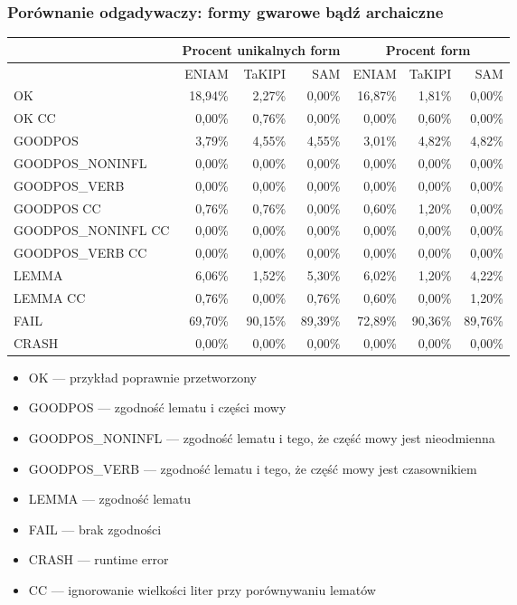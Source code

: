 \documentclass{beamer}
\begin{document}
\begin{frame}
\frametitle{Porównanie odgadywaczy: formy gwarowe bądź archaiczne}
\begin{center}\begin{scriptsize}
\begin{tabular}{l|rrr|rrr}
& \multicolumn{3}{c|}{Procent unikalnych form} &
\multicolumn{3}{c}{Procent form} \\
\hline
& ENIAM & TaKIPI & SAM & ENIAM & TaKIPI & SAM \\
\hline
OK & 18,94\% & 2,27\% & 0,00\% & 16,87\% & 1,81\% & 0,00\% \\
OK CC & 0,00\% & 0,76\% & 0,00\% & 0,00\% & 0,60\% & 0,00\% \\
GOODPOS & 3,79\% & 4,55\% & 4,55\% & 3,01\% & 4,82\% & 4,82\% \\
GOODPOS\_NONINFL & 0,00\% & 0,00\% & 0,00\% & 0,00\% & 0,00\% & 0,00\% \\
GOODPOS\_VERB & 0,00\% & 0,00\% & 0,00\% & 0,00\% & 0,00\% & 0,00\% \\
GOODPOS CC & 0,76\% & 0,76\% & 0,00\% & 0,60\% & 1,20\% & 0,00\% \\
GOODPOS\_NONINFL CC & 0,00\% & 0,00\% & 0,00\% & 0,00\% & 0,00\% & 0,00\% \\
GOODPOS\_VERB CC & 0,00\% & 0,00\% & 0,00\% & 0,00\% & 0,00\% & 0,00\% \\
LEMMA & 6,06\% & 1,52\% & 5,30\% & 6,02\% & 1,20\% & 4,22\% \\
LEMMA CC & 0,76\% & 0,00\% & 0,76\% & 0,60\% & 0,00\% & 1,20\% \\
FAIL & 69,70\% & 90,15\% & 89,39\% & 72,89\% & 90,36\% & 89,76\% \\
CRASH & 0,00\% & 0,00\% & 0,00\% & 0,00\% & 0,00\% & 0,00\% \\
\end{tabular}
\end{scriptsize}\end{center}
\begin{scriptsize}\begin{itemize}
\item OK --- przykład poprawnie przetworzony
\item GOODPOS --- zgodność lematu i części mowy
\item GOODPOS\_NONINFL --- zgodność lematu i tego, że część mowy jest nieodmienna
\item GOODPOS\_VERB --- zgodność lematu i tego, że część mowy jest czasownikiem
\item LEMMA --- zgodność lematu
\item FAIL --- brak zgodności
\item CRASH --- runtime error
\item CC --- ignorowanie wielkości liter przy porównywaniu lematów
\end{itemize}\end{scriptsize}
\end{frame}
\end{document}
